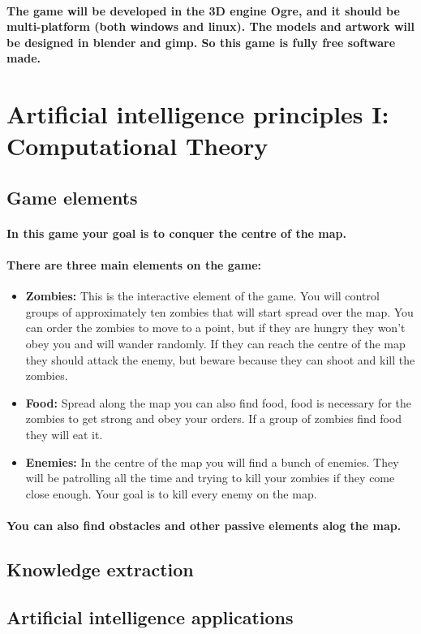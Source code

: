 \documentclass[a4paper,10pt]{article}
\newcommand{\p}[1]{\paragraph{\indent\textnormal{#1}}}
\begin{document}
    \p{The game will be developed in the 3D engine  Ogre, and it should be multi-platform (both windows and linux). The models and artwork will be designed in blender and gimp. So this game is fully free software made.}
    

\newpage
\section{Artificial intelligence principles I: Computational Theory}

  \subsection{Game elements}

    \p{In this game your goal is to conquer the centre of the map.}

    \p{There are three main elements on the game:}

    \begin{itemize}
     \item \textbf{Zombies:} This is the interactive element of the game. You will control groups of approximately ten zombies that will start spread over the map. You can order the zombies to move to a point, but if they are hungry they won't obey you and will wander randomly. If they can reach the centre of the map they should attack the enemy, but beware because they can shoot and kill the zombies.
     \item \textbf{Food:} Spread along the map you can also find food, food is necessary for the zombies to get strong and obey your orders. If a group of zombies find food they will eat it.
     \item \textbf{Enemies:} In the centre of the map you will find a bunch of enemies. They will be patrolling all the time and trying to kill your zombies if they come close enough. Your goal is to kill every enemy on the map.
    \end{itemize}

  \p{You can also find obstacles and other passive elements alog the map.}


  \subsection{Knowledge extraction}

  \subsection{Artificial intelligence applications}
\end{document}
